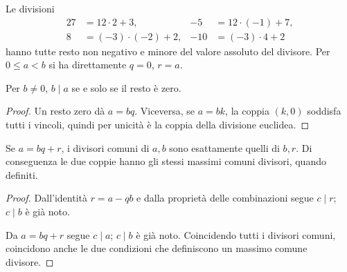 \begin{esempio}
Le divisioni
\[
\begin{aligned}
27&=12\cdot2+3,&-5&=12\cdot(-1)+7,\\
8&=(-3)\cdot(-2)+2,&-10&=(-3)\cdot4+2
\end{aligned}
\]
hanno tutte resto non negativo e minore del valore assoluto del divisore. Per $0\le a<b$ si ha direttamente $q=0$, $r=a$.
\end{esempio}

\begin{corollario}
Per $b\ne0$, $b\mid a$ se e solo se il resto è zero.
\end{corollario}
\begin{proof}
Un resto zero dà $a=bq$. Viceversa, se $a=bk$, la coppia $(k,0)$ soddisfa tutti i vincoli, quindi per unicità è la coppia della divisione euclidea.
\end{proof}

\begin{lemma}\label{lem:passo-euclideo}
Se $a=bq+r$, i divisori comuni di $a,b$ sono esattamente quelli di $b,r$. Di conseguenza le due coppie hanno gli stessi massimi comuni divisori, quando definiti.
\end{lemma}
\begin{proof}
 Dall'identità $r=a-qb$ e dalla proprietà delle combinazioni segue $c\mid r$; $c\mid b$ è già noto.

 Da $a=bq+r$ segue $c\mid a$; $c\mid b$ è già noto. Coincidendo tutti i divisori comuni, coincidono anche le due condizioni che definiscono un massimo comune divisore.
\end{proof}

